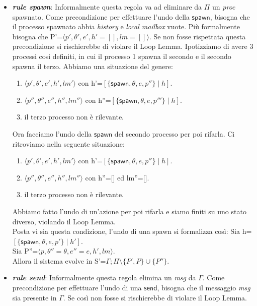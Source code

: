 \documentclass[background.tex]{subfiles}
\begin{document}
	\begin{itemize}
		\item \textit{\textbf{rule spawn}}: Informalmente questa regola va ad eliminare da $\Pi$ un \textit{proc} spawnato. Come precondizione per effettuare l'undo della $\mathsf{spawn}$, bisogna che il processo spawnato abbia \textit{history} e \textit{local mailbox} vuote. Più formalmente bisogna che P'=$\displaystyle \langle p',\theta',e',h'=[],lm=[]\rangle$. Se non fosse rispettata questa precondizione si rischierebbe di violare il Loop Lemma.
		Ipotizziamo di avere 3 processi cosi definiti, in cui il processo 1 spawna il secondo e il secondo spawna il terzo.
		Abbiamo una situazione del genere:
		\begin{enumerate}
			\item $\displaystyle \langle p',\theta',e',h',lm' \rangle$ con h'=$\displaystyle [\{\mathsf{spawn},\theta,e,p''\} \mid h]$.
			\item  $\displaystyle \langle p'',\theta'',e'',h'',lm''\rangle$ con h''=$\displaystyle[\{\mathsf{spawn},\theta,e,p'''\} \mid h]$.
			\item il terzo processo non è rilevante.
		\end{enumerate}
		Ora facciamo l'undo della $\mathsf{spawn}$ del secondo processo per poi rifarla.
		Ci ritroviamo nella seguente situazione:
			\begin{enumerate}
			\item $\displaystyle \langle p',\theta',e',h',lm' \rangle$ con h'=$\displaystyle [\{\mathsf{spawn},\theta,e,p''\} \mid h]$.
			\item $\displaystyle \langle p'',\theta'',e'',h'',lm'' \rangle$ con h''=[] ed lm''=[].
			\item il terzo processo non è rilevante.
		\end{enumerate}
		Abbiamo fatto l'undo di un'azione per poi rifarla e siamo finiti su uno stato diverso, violando il Loop Lemma.\\
		Posta vi sia questa condizione, l'undo di una spawn si formalizza così:
		Sia h=$\displaystyle [\{\mathsf{spawn},\theta,e,p'\} \mid h']$.\\
		Sia P''=$\displaystyle \langle p,\theta'' = \theta,e''=e,h',lm \rangle$.\\
		Allora il sistema evolve in S'=$\displaystyle \Gamma;\Pi\setminus\{P',P\}\cup\{P''\}$.
		\item \textit{\textbf{rule send}}: Informalmente questa regola elimina un \textit{msg} da $\Gamma$. Come precondizione per effettuare l'undo di una $\mathsf{send}$, bisogna che il messaggio \textit{msg} sia presente in $\Gamma$. Se così non fosse si rischierebbe di violare il Loop Lemma.

\end{itemize}
\end{document}
